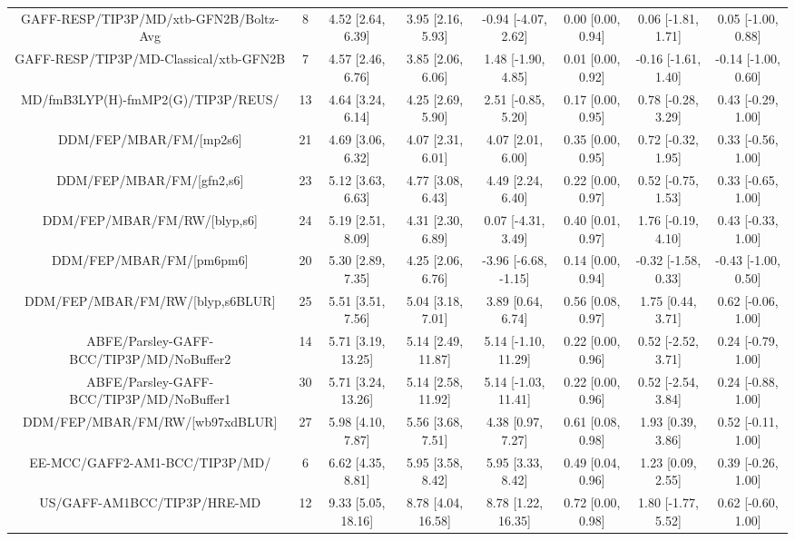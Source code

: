 \documentclass[8pt]{article}
\begin{document}
\begin{center}
\begin{footnotesize}
\begin{longtable}{|cccccccc|}
   GAFF-RESP/TIP3P/MD/xtb-GFN2B/Boltz-Avg &   8 &   4.52 [2.64, 6.39] &   3.95 [2.16, 5.93] &   -0.94 [-4.07, 2.62] &  0.00 [0.00, 0.94] &   0.06 [-1.81, 1.71] &   0.05 [-1.00, 0.88] \\
   GAFF-RESP/TIP3P/MD-Classical/xtb-GFN2B &   7 &   4.57 [2.46, 6.76] &   3.85 [2.06, 6.06] &    1.48 [-1.90, 4.85] &  0.01 [0.00, 0.92] &  -0.16 [-1.61, 1.40] &  -0.14 [-1.00, 0.60] \\
       MD/fmB3LYP(H)-fmMP2(G)/TIP3P/REUS/ &  13 &   4.64 [3.24, 6.14] &   4.25 [2.69, 5.90] &    2.51 [-0.85, 5.20] &  0.17 [0.00, 0.95] &   0.78 [-0.28, 3.29] &   0.43 [-0.29, 1.00] \\
                  DDM/FEP/MBAR/FM/[mp2s6] &  21 &   4.69 [3.06, 6.32] &   4.07 [2.31, 6.01] &     4.07 [2.01, 6.00] &  0.35 [0.00, 0.95] &   0.72 [-0.32, 1.95] &   0.33 [-0.56, 1.00] \\
                DDM/FEP/MBAR/FM/[gfn2,s6] &  23 &   5.12 [3.63, 6.63] &   4.77 [3.08, 6.43] &     4.49 [2.24, 6.40] &  0.22 [0.00, 0.97] &   0.52 [-0.75, 1.53] &   0.33 [-0.65, 1.00] \\
             DDM/FEP/MBAR/FM/RW/[blyp,s6] &  24 &   5.19 [2.51, 8.09] &   4.31 [2.30, 6.89] &    0.07 [-4.31, 3.49] &  0.40 [0.01, 0.97] &   1.76 [-0.19, 4.10] &   0.43 [-0.33, 1.00] \\
                 DDM/FEP/MBAR/FM/[pm6pm6] &  20 &   5.30 [2.89, 7.35] &   4.25 [2.06, 6.76] &  -3.96 [-6.68, -1.15] &  0.14 [0.00, 0.94] &  -0.32 [-1.58, 0.33] &  -0.43 [-1.00, 0.50] \\
         DDM/FEP/MBAR/FM/RW/[blyp,s6BLUR] &  25 &   5.51 [3.51, 7.56] &   5.04 [3.18, 7.01] &     3.89 [0.64, 6.74] &  0.56 [0.08, 0.97] &    1.75 [0.44, 3.71] &   0.62 [-0.06, 1.00] \\
 ABFE/Parsley-GAFF-BCC/TIP3P/MD/NoBuffer2 &  14 &  5.71 [3.19, 13.25] &  5.14 [2.49, 11.87] &   5.14 [-1.10, 11.29] &  0.22 [0.00, 0.96] &   0.52 [-2.52, 3.71] &   0.24 [-0.79, 1.00] \\
 ABFE/Parsley-GAFF-BCC/TIP3P/MD/NoBuffer1 &  30 &  5.71 [3.24, 13.26] &  5.14 [2.58, 11.92] &   5.14 [-1.03, 11.41] &  0.22 [0.00, 0.96] &   0.52 [-2.54, 3.84] &   0.24 [-0.88, 1.00] \\
          DDM/FEP/MBAR/FM/RW/[wb97xdBLUR] &  27 &   5.98 [4.10, 7.87] &   5.56 [3.68, 7.51] &     4.38 [0.97, 7.27] &  0.61 [0.08, 0.98] &    1.93 [0.39, 3.86] &   0.52 [-0.11, 1.00] \\
           EE-MCC/GAFF2-AM1-BCC/TIP3P/MD/ &   6 &   6.62 [4.35, 8.81] &   5.95 [3.58, 8.42] &     5.95 [3.33, 8.42] &  0.49 [0.04, 0.96] &    1.23 [0.09, 2.55] &   0.39 [-0.26, 1.00] \\
              US/GAFF-AM1BCC/TIP3P/HRE-MD &  12 &  9.33 [5.05, 18.16] &  8.78 [4.04, 16.58] &    8.78 [1.22, 16.35] &  0.72 [0.00, 0.98] &   1.80 [-1.77, 5.52] &   0.62 [-0.60, 1.00] \\
\end{longtable}
\end{footnotesize}
\end{center}
\end{document}
